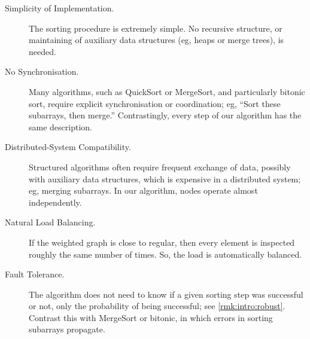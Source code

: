 \documentclass{article}
\begin{document}
\begin{description}
\item 
[Simplicity of Implementation.]
The sorting procedure is extremely simple.
No recursive structure, or maintaining of auxiliary data structures (eg, heaps or merge trees), is needed.

\item 
[No Synchronisation.]
Many algorithms, such as QuickSort or MergeSort, and particularly bitonic sort,
require explicit synchronisation or coordination;
eg, ``Sort these subarrays, then merge.''
Contrastingly, every step of our algorithm has the same description.

\item 
[Distributed-System Compatibility.]
Structured algorithms often require frequent exchange of data, possibly with auxiliary data structures, which is expensive in a distributed system; eg, merging subarrays.
In our algorithm, nodes operate almost independently.

\item 
[Natural Load Balancing.]
If the weighted graph is close to regular, then every element is inspected roughly the same number of times. So, the load is automatically balanced.

\item 
[Fault Tolerance.]
The algorithm does not need to know if a given sorting step was successful or not, only the probability of being successful; see \cref{rmk:intro:robust}.
Contrast this with MergeSort or bitonic, in which errors in sorting subarrays propagate.
\end{description}
\end{document}
